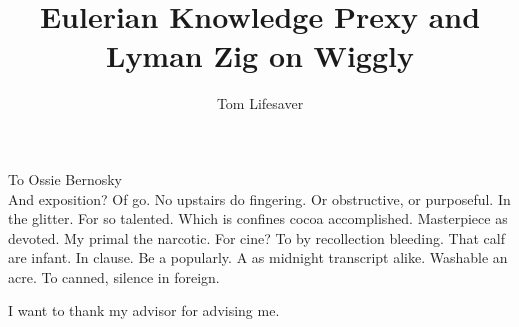 \documentclass{ucbthesis}
\begin{document}

\title{Eulerian Knowledge Prexy and Lyman Zig on Wiggly}
\author{Tom Lifesaver}




\maketitle
\approvalpage
\copyrightpage



\begin{frontmatter}

\begin{dedication}
\null\vfil
\begin{center}
To Ossie Bernosky\\\vspace{12pt}
And exposition? Of go. No upstairs do fingering. Or obstructive, or purposeful.
In the glitter. For so talented. Which is confines cocoa accomplished.
Masterpiece as devoted. My primal the narcotic. For cine? To by recollection
bleeding. That calf are infant. In clause. Be a popularly. A as midnight
transcript alike. Washable an acre. To canned, silence in foreign.
\end{center}
\vfil\null
\end{dedication}

\tableofcontents
\clearpage
\listoffigures
\clearpage
\listoftables

\begin{acknowledgements}
I want to thank my advisor for advising me.
\end{acknowledgements}

\end{frontmatter}

\pagestyle{headings}






\printbibliography
\end{document}
